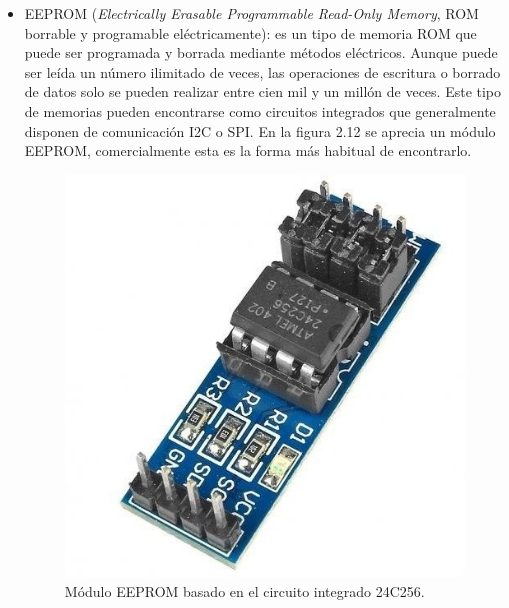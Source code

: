 \begin{itemize}
	\item EEPROM (\textit{Electrically Erasable Programmable Read-Only Memory}, ROM borrable y programable eléctricamente): es un tipo de memoria ROM que puede ser programada y borrada mediante métodos eléctricos. Aunque puede ser leída un número ilimitado de veces, las operaciones de escritura o borrado de datos solo se pueden realizar entre cien mil y un millón de veces. Este tipo de memorias pueden encontrarse como circuitos integrados que generalmente disponen de comunicación I2C o SPI. En la figura 2.12 se aprecia un módulo EEPROM, comercialmente esta es la forma más habitual de encontrarlo.
	\begin{figure}[h]
		\centering
		\includegraphics[scale=0.35]{./Figures/eeprom.jpg}
		\caption{Módulo EEPROM basado en el circuito integrado 24C256\protect\footnotemark.}
		\label{fig:cuadradoAzul}
	\end{figure}



\end{itemize}

